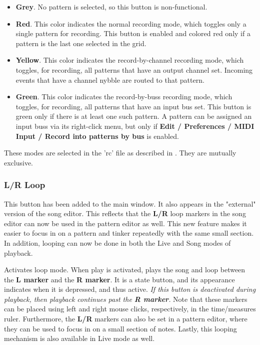    \begin{itemize}
      \item \textbf{Grey}.
         No pattern is selected, so this button is non-functional.
      \item \textbf{Red}.
         This color indicates the normal recording mode, which toggles only a
         single pattern for recording.
         This button is enabled and colored red only if a pattern is the last
         one selected in the grid.
      \item \textbf{Yellow}.
         This color indicates the record-by-channel recording mode,
         which toggles, for recording, all patterns that have an
         output channel set.
         Incoming events that have a channel nybble are routed to that
         pattern.
      \item \textbf{Green}.
         This color indicates the record-by-buss recording mode,
         which toggles, for recording, all patterns that have an
         input bus set. This button is green only if there is at least
         one such pattern.
         A pattern can be assigned an input buss via its right-click
         menu, but only if
         \textbf{Edit / Preferences / MIDI Input / Record into patterns by bus}
         is enabled.
   \end{itemize}

   These modes are selected in the 'rc' file as described in
   .
   They are mutually exclusive.

\subsubsection{L/R Loop}
\label{subsubsec:introduction_loop_button}

   This button has been added to the main window.
   It also appears in the "external" version of the song editor.
   This reflects that the \textbf{L/R} loop markers in the song editor can now
   be used in the pattern editor as well.  This new feature makes it easier to
   focus in on a pattern and tinker repeatedly with the same small section.
   In addition, looping can now be done in both the Live and Song modes of
   playback.

   Activates loop mode. When play is activated, plays the song and loop
   between the
   \textbf{L marker} and the \textbf{R marker}.
   It is a state button, and its appearance indicates when it is
   depressed, and thus active.
   \textsl{If this button is deactivated during playback, then playback
   continues past the \textbf{R marker}.}
   Note that these markers can be placed using left
   and right mouse clicks, respectively, in the time/measures ruler.
   Furthermore, the \textbf{L/R} markers can also be set in a pattern editor,
   where they can be used to focus in on a small section of notes.
   Lastly, this looping mechanism is also available in Live mode as well.

